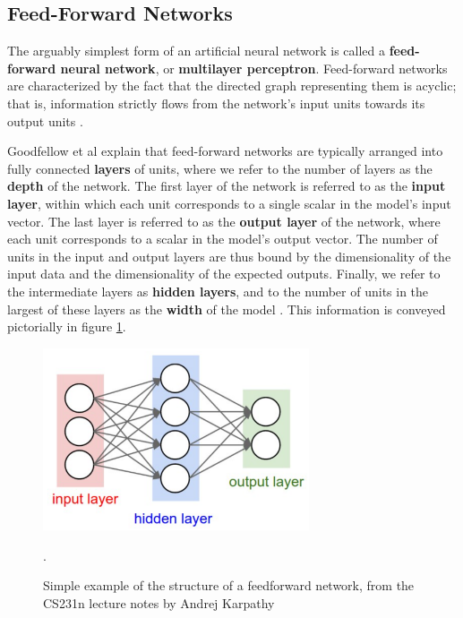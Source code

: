 \documentclass[12pt, titlepage]{report}
\theoremstyle{definition}
\begin{document}
\subsection{Feed-Forward Networks}
The arguably simplest form of an artificial neural network is called a \textbf{feed-forward neural network}, or \textbf{multilayer perceptron}. Feed-forward networks are characterized by the fact that the directed graph representing them is acyclic; that is, information strictly flows from the network's input units towards its output units \cite[p. 164]{goodfellow2016deep}.

Goodfellow et al explain that feed-forward networks are typically arranged into fully connected \textbf{layers} of units, where we refer to the number of layers as the \textbf{depth} of the network. The first layer of the network is referred to as the \textbf{input layer}, within which each unit corresponds to a single scalar in the model's input vector. The last layer is referred to as the \textbf{output layer} of the network, where each unit corresponds to a scalar in the model's output vector. The number of units in the input and output layers are thus bound by the dimensionality of the input data and the dimensionality of the expected outputs. Finally, we refer to the intermediate layers as \textbf{hidden layers}, and to the number of units in the largest of these layers as the \textbf{width} of the model \cite[p. 164-165]{goodfellow2016deep}. This information is conveyed pictorially in figure \ref{figure:feedforward}.

\begin{figure}
\centering
\includegraphics[width=0.7\textwidth]{img/feedforward.png}\\
\caption{Simple example of the structure of a feedforward network, from the CS231n lecture notes by Andrej Karpathy \cite[Neural Networks Part 1 : Setting up the Architecture]{karpathy2017cs231n}}.
\label{figure:feedforward}
\end{figure}
\end{document}
